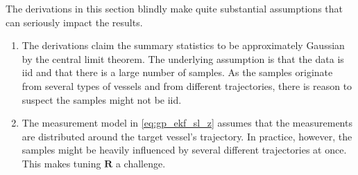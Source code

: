 The derivations in this section blindly make quite substantial assumptions that can seriously impact the results.
\begin{enumerate}
    \item The derivations claim the summary statistics to be approximately Gaussian by the central limit theorem. The underlying assumption is that the data is \acrshort{iid} and that there is a large number of samples. As the samples originate from several types of vessels and from different trajectories, there is reason to suspect the samples might not be \acrshort{iid}.
    \item The measurement model in \cref{eq:gp_ekf_sl_z} assumes that the measurements are distributed around the target vessel's trajectory. In practice, however, the samples might be heavily influenced by several different trajectories at once. This makes tuning $\boldsymbol{R}$ a challenge.
\end{enumerate}


